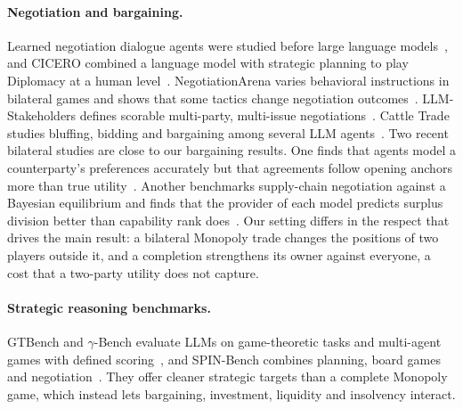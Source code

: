 \paragraph{Negotiation and bargaining.}
Learned negotiation dialogue agents were studied before large language models~\cite{lewis2017dealornodeal}, and CICERO combined a language model with strategic planning to play Diplomacy at a human level~\cite{metafair2022cicero}. NegotiationArena varies behavioral instructions in bilateral games and shows that some tactics change negotiation outcomes~\cite{bianchi2024negotiationarena}. LLM-Stakeholders defines scorable multi-party, multi-issue negotiations~\cite{abdelnabi2024stakeholders}. Cattle Trade studies bluffing, bidding and bargaining among several LLM agents~\cite{muller2026cattletrade}. Two recent bilateral studies are close to our bargaining results. One finds that agents model a counterparty's preferences accurately but that agreements follow opening anchors more than true utility~\cite{cosentino2026counterparty}. Another benchmarks supply-chain negotiation against a Bayesian equilibrium and finds that the provider of each model predicts surplus division better than capability rank does~\cite{liang2026supplychain}. Our setting differs in the respect that drives the main result: a bilateral Monopoly trade changes the positions of two players outside it, and a completion strengthens its owner against everyone, a cost that a two-party utility does not capture.

\paragraph{Strategic reasoning benchmarks.}
GTBench and $\gamma$-Bench evaluate LLMs on game-theoretic tasks and multi-agent games with defined scoring~\cite{duan2024gtbench,huang2025gamabench}, and SPIN-Bench combines planning, board games and negotiation~\cite{yao2025spinbench}. They offer cleaner strategic targets than a complete Monopoly game, which instead lets bargaining, investment, liquidity and insolvency interact.

